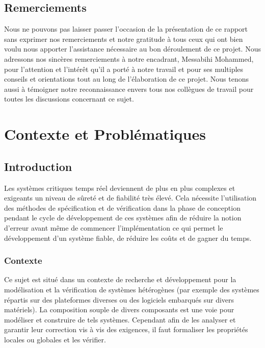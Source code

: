 \documentclass[french]{spimufcphdthesis}
\begin{document}
 

\chapter*{Remerciements}
Nous ne pouvons pas laisser passer l’occasion de la présentation de ce rapport sans exprimer nos remerciements et notre gratitude à tous ceux qui ont bien voulu nous apporter l’assistance nécessaire au bon déroulement de ce projet.
Nous adressons nos sincères remerciements à notre encadrant, Messabihi Mohammed, pour l’attention et l’intérêt qu’il a porté à notre travail et pour ses multiples conseils et orientations tout au long de l'élaboration de ce projet.
Nous tenons aussi à témoigner notre reconnaissance envers tous nos collègues de travail pour toutes les discussions concernant ce sujet.

\tableofcontents


\mainmatter
 
\part{Contexte et Problématiques}
\chapter{Introduction}
Les systèmes critiques temps réel deviennent de plus en plus complexes et exigeants un niveau de sûreté et de fiabilité très élevé. Cela nécessite l'utilisation des méthodes de spécification et de vérification dans la phase de conception pendant le cycle de développement de ces systèmes afin de réduire la notion d'erreur avant même de commencer l'implémentation ce qui permet le développement d'un système fiable, de réduire les coûts et de gagner du temps.
 
 
\section{Contexte}

Ce sujet est situé dans un contexte de recherche et développement pour la modélisation et la vérification
de  systèmes  hétérogènes  (par  exemple  des  systèmes  répartis  sur  des  plateformes  diverses  ou  des
logiciels  embarqués  sur  divers  matériels).   La  composition  souple  de  divers  composants  est  une
voie pour modéliser et construire de tels systèmes.  Cependant afin de les analyser et garantir leur
correction vis à vis des exigences, il faut formaliser les propriétés locales ou globales et les vérifier.
\end{document}
